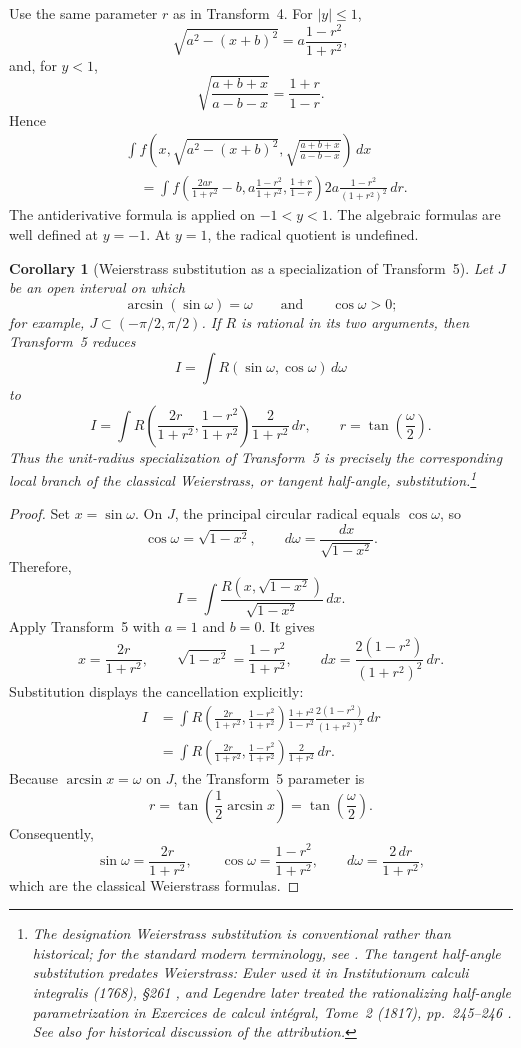 \documentclass[11pt]{article}
\newtheorem{corollary}[theorem]{Corollary}
\theoremstyle{remark}
\begin{document}
Use the same parameter $r$ as in Transform~4. For $|y|\le1$,
\[
\sqrt{a^2-(x+b)^2}=a\frac{1-r^2}{1+r^2},
\]
and, for $y<1$,
\[
\sqrt{\frac{a+b+x}{a-b-x}}=\frac{1+r}{1-r}.
\]
Hence
\begin{align*}
&\int f\!\left(x,\sqrt{a^2-(x+b)^2},\sqrt{\frac{a+b+x}{a-b-x}}\right)\,dx\\
&\quad=
\int f\!\left(
\frac{2ar}{1+r^2}-b,
a\frac{1-r^2}{1+r^2},
\frac{1+r}{1-r}
\right)
2a\frac{1-r^2}{(1+r^2)^2}\,dr.
\end{align*}
The antiderivative formula is applied on $-1<y<1$. The algebraic formulas are well defined at $y=-1$. At $y=1$, the radical quotient is undefined.

\begin{corollary}[Weierstrass substitution as a specialization of Transform~5]
\label{cor:weierstrass}
Let $J$ be an open interval on which
\[
\arcsin(\sin\omega)=\omega
\qquad\text{and}\qquad
\cos\omega>0;
\]
for example, $J\subset(-\pi/2,\pi/2)$. If $R$ is rational in its two arguments, then Transform~5 reduces
\[
I=\int R(\sin\omega,\cos\omega)\,d\omega
\]
to
\[
I=\int R\!\left(\frac{2r}{1+r^2},\frac{1-r^2}{1+r^2}\right)\frac{2}{1+r^2}\,dr,
\qquad
r=\tan\!\left(\frac{\omega}{2}\right).
\]
Thus the unit-radius specialization of Transform~5 is precisely the
corresponding local branch of the classical Weierstrass, or tangent
half-angle, substitution.\footnote{The designation \emph{Weierstrass substitution} is conventional
rather than historical; for the standard modern terminology, see
\cite{Weisstein}. The tangent half-angle substitution predates Weierstrass:
Euler used it in \emph{Institutionum calculi integralis} (1768), \S261
\cite[\S261]{Euler}, and Legendre later treated the rationalizing half-angle
parametrization in \emph{Exercices de calcul int\'egral}, Tome~2 (1817),
pp.~245--246 \cite[pp.~245--246]{Legendre}. See also \cite{Johnson} for
historical discussion of the attribution.}
\end{corollary}

\begin{proof}
Set $x=\sin\omega$. On $J$, the principal circular radical equals $\cos\omega$, so
\[
\cos\omega=\sqrt{1-x^2},
\qquad
d\omega=\frac{dx}{\sqrt{1-x^2}}.
\]
Therefore,
\[
I=\int \frac{R\!\left(x,\sqrt{1-x^2}\right)}{\sqrt{1-x^2}}\,dx.
\]
Apply Transform~5 with $a=1$ and $b=0$. It gives
\[
x=\frac{2r}{1+r^2},
\qquad
\sqrt{1-x^2}=\frac{1-r^2}{1+r^2},
\qquad
dx=\frac{2(1-r^2)}{(1+r^2)^2}\,dr.
\]
Substitution displays the cancellation explicitly:
\begin{align*}
I
&=\int
R\!\left(\frac{2r}{1+r^2},\frac{1-r^2}{1+r^2}\right)
\frac{1+r^2}{1-r^2}
\frac{2(1-r^2)}{(1+r^2)^2}\,dr\\
&=\int
R\!\left(\frac{2r}{1+r^2},\frac{1-r^2}{1+r^2}\right)
\frac{2}{1+r^2}\,dr.
\end{align*}
Because $\arcsin x=\omega$ on $J$, the Transform~5 parameter is
\[
r=\tan\!\left(\frac{1}{2}\arcsin x\right)=\tan\!\left(\frac{\omega}{2}\right).
\]
Consequently,
\[
\sin\omega=\frac{2r}{1+r^2},
\qquad
\cos\omega=\frac{1-r^2}{1+r^2},
\qquad
d\omega=\frac{2\,dr}{1+r^2},
\]
which are the classical Weierstrass formulas.
\end{proof}
\end{document}
